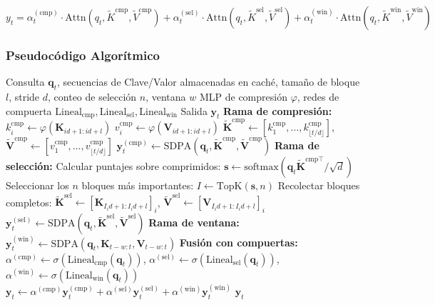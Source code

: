 \documentclass[11pt,a4paper]{article}
\begin{document}
\[
y_t = \alpha_t^{(\text{cmp})} \cdot \text{Attn}(q_t, \tilde{K}^{\text{cmp}}, \tilde{V}^{\text{cmp}}) + \alpha_t^{(\text{sel})} \cdot \text{Attn}(q_t, \tilde{K}^{\text{sel}}, \tilde{V}^{\text{sel}}) + \alpha_t^{(\text{win})} \cdot \text{Attn}(q_t, \tilde{K}^{\text{win}}, \tilde{V}^{\text{win}})
\]

\subsubsection{Pseudocódigo Algorítmico}

\begin{algorithm}[H]
\caption{NSA: Ramas Comprimida + Seleccionada + Ventana con Compuertas Aprendidas}
\begin{algorithmic}[1]
\Require Consulta $\mathbf{q}_t$, secuencias de Clave/Valor almacenadas en caché, tamaño de bloque $l$, stride $d$, conteo de selección $n$, ventana $w$
\Require MLP de compresión $\varphi$, redes de compuerta $\text{Lineal}_{\text{cmp}}, \text{Lineal}_{\text{sel}}, \text{Lineal}_{\text{win}}$
\Ensure Salida $\mathbf{y}_t$
\State \textbf{Rama de compresión:}
    \State $k_i^{\text{cmp}} \gets \varphi(\mathbf{K}_{id+1:id+l})$ 
    \State $v_i^{\text{cmp}} \gets \varphi(\mathbf{V}_{id+1:id+l})$
\EndFor
\State $\tilde{\mathbf{K}}^{\text{cmp}} \gets [k_1^{\text{cmp}}, \ldots, k_{\lfloor t/d \rfloor}^{\text{cmp}}]$, $\tilde{\mathbf{V}}^{\text{cmp}} \gets [v_1^{\text{cmp}}, \ldots, v_{\lfloor t/d \rfloor}^{\text{cmp}}]$
\State $\mathbf{y}_t^{(\text{cmp})} \gets \text{SDPA}(\mathbf{q}_t, \tilde{\mathbf{K}}^{\text{cmp}}, \tilde{\mathbf{V}}^{\text{cmp}})$
\State \textbf{Rama de selección:}
\State Calcular puntajes sobre comprimidos: $\mathbf{s} \gets \text{softmax}(\mathbf{q}_t \tilde{\mathbf{K}}^{\text{cmp}\top} / \sqrt{d})$
\State Seleccionar los $n$ bloques más importantes: $I \gets \mathrm{TopK}(\mathbf{s}, n)$
\State Recolectar bloques completos: $\tilde{\mathbf{K}}^{\text{sel}} \gets [\mathbf{K}_{I_i d+1:I_i d+l}]_i$, $\tilde{\mathbf{V}}^{\text{sel}} \gets [\mathbf{V}_{I_i d+1:I_i d+l}]_i$
\State $\mathbf{y}_t^{(\text{sel})} \gets \text{SDPA}(\mathbf{q}_t, \tilde{\mathbf{K}}^{\text{sel}}, \tilde{\mathbf{V}}^{\text{sel}})$
\State \textbf{Rama de ventana:}
\State $\mathbf{y}_t^{(\text{win})} \gets \text{SDPA}(\mathbf{q}_t, \mathbf{K}_{t-w:t}, \mathbf{V}_{t-w:t})$
\State \textbf{Fusión con compuertas:}
\State $\alpha^{(\text{cmp})} \gets \sigma(\text{Lineal}_{\text{cmp}}(\mathbf{q}_t))$, $\alpha^{(\text{sel})} \gets \sigma(\text{Lineal}_{\text{sel}}(\mathbf{q}_t))$, $\alpha^{(\text{win})} \gets \sigma(\text{Lineal}_{\text{win}}(\mathbf{q}_t))$
\State $\mathbf{y}_t \gets \alpha^{(\text{cmp})} \mathbf{y}_t^{(\text{cmp})} + \alpha^{(\text{sel})} \mathbf{y}_t^{(\text{sel})} + \alpha^{(\text{win})} \mathbf{y}_t^{(\text{win})}$
\Return $\mathbf{y}_t$
\end{algorithmic}
\end{algorithm}
\end{document}
